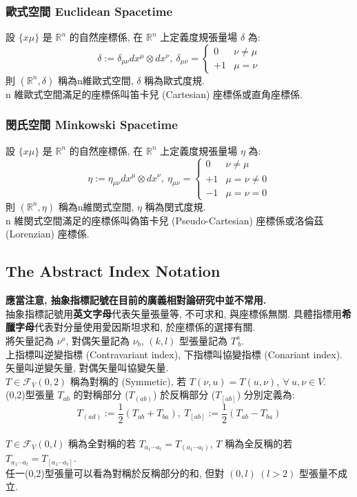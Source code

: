 \documentclass{article}
\begin{document}
\begin{CJK}{UTF8}{bsmi}
\subsubsection{歐式空間 Euclidean Spacetime}
設 $\{ x\mu\}$ 是 $\mathbb{R}^n$ 的自然座標係, 在 $\mathbb{R}^n$ 上定義度規張量場 $\delta$ 為: $$\delta:=\delta_{\mu\nu}dx^\mu\otimes dx^\nu,\ \delta_{\mu\nu} =\begin{cases}0&\nu \neq \mu \\ +1&\mu =\nu \end{cases} $$ 
則 $(\mathbb{R}^n,\delta)$ 稱為n維歐式空間, $\delta$ 稱為歐式度規.
\\n 維歐式空間滿足的座標係叫笛卡兒 (Cartesian) 座標係或直角座標係.
\subsubsection{閔氏空間 Minkowski Spacetime}
設 $\{ x\mu\}$ 是 $\mathbb{R}^n$ 的自然座標係, 在 $\mathbb{R}^n$ 上定義度規張量場 $\eta$ 為: $$\eta:=\eta_{\mu\nu}dx^\mu\otimes dx^\nu,\ \eta_{\mu\nu} =\begin{cases}0&\nu \neq \mu \\ +1&\mu =\nu\neq 0 \\ -1&\mu=\nu=0\end{cases}$$ 
則 $(\mathbb{R}^n,\eta)$ 稱為n維閔式空間, $\eta$ 稱為閔式度規.
\\n 維閔式空間滿足的座標係叫偽笛卡兒 (Pseudo-Cartesian) 座標係或洛倫茲 (Lorenzian) 座標係.
\subsection{The Abstract Index Notation}
\textbf{應當注意, 抽象指標記號在目前的廣義相對論研究中並不常用.}
\\ 抽象指標記號用\textbf{英文字母}代表矢量張量等, 不可求和, 與座標係無關. 具體指標用\textbf{希臘字母}代表對分量使用愛因斯坦求和, 於座標係的選擇有關.
\\ 將矢量記為 $\nu^a$, 對偶矢量記為 $\nu_b$, $(k,l)$ 型張量記為 $T^a_{\ b}$.
\\ 上指標叫逆變指標 (Contravariant index), 下指標叫協變指標 (Conariant index). 矢量叫逆變矢量, 對偶矢量叫協變矢量.
\\ $T\in \mathscr{F}_V(0,2)$ 稱為對稱的 (Symmetic), 若 $T(\nu,u)=T(u,\nu),\ \forall\ u,\nu\in V$.
\\(0,2)型張量 $T_{ab}$ 的對稱部分 ($T_{(ab)}$) 於反稱部分 ($T_{[ab]}$) 分別定義為: $$T_{(ad)}:=\frac{1}{2}(T_{ab}+T_{ba}),\ T_{[ab]}:=\frac{1}{2}(T_{ab}-T_{ba}) $$
\\ $T\in \mathscr{F}_V(0,l)$ 稱為全對稱的若 $T_{a_1\cdots a_l}=T_{(a_1\cdots a_l)}$, $T$ 稱為全反稱的若 $T_{a_1\cdots a_l}=T_{[a_1\cdots a_l]}$.
\\ 任一(0,2)型張量可以看為對稱於反稱部分的和, 但對 $(0,l) \ (l>2)$ 型張量不成立.


\end{CJK}
\end{document}
